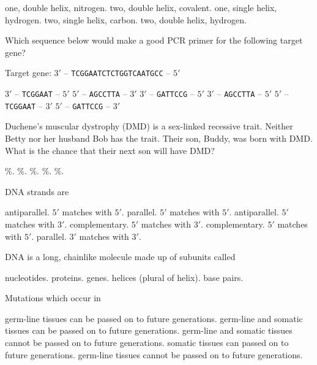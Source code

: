 \begin{choices}
\choice one, double helix, nitrogen.
\choice two, double helix, covalent.
\choice one, single helix, hydrogen.
\choice two, single helix, carbon.
\correctchoice two, double helix, hydrogen.
\end{choices}

\question
Which sequence below would make a good PCR primer for the following target gene?

\vspace{0.4\baselineskip}
Target gene: $3'$ -- \texttt{TCGGAATCTCTGGTCAATGCC} -- $5'$

\begin{choices}
\choice $3'$ -- \texttt{TCGGAAT} -- $5'$
\correctchoice $5'$ -- \texttt{AGCCTTA} -- $3'$
\choice $3'$ -- \texttt{GATTCCG} -- $5'$
\choice $3'$ -- \texttt{AGCCTTA} -- $5'$
\choice $5'$ -- \texttt{TCGGAAT} -- $3'$
\choice $5'$ -- \texttt{GATTCCG} -- $3'$
\end{choices}

\question
Duchene's muscular dystrophy (DMD) is a sex-linked recessive trait. Neither Betty nor her husband Bob has the trait. Their son, Buddy, was born with DMD. What is the chance that their next son will have DMD?

\begin{choices}
\%.
\%.
\%.
\%.
\%.
\end{choices}

\question
DNA strands are

\begin{choices}
\choice antiparallel. $5'$ matches with $5'$.
\choice parallel. $5'$ matches with $5'$.
\correctchoice antiparallel. $5'$ matches with $3'$.
\choice complementary. $5'$ matches with $3'$.
\choice complementary. $5'$ matches with $5'$.
\choice parallel. $3'$ matches with $3'$.
\end{choices}

\question
DNA is a long, chainlike molecule made up of subunits called

\begin{choices}
\correctchoice nucleotides.
\choice proteins.
\choice genes.
\choice helices (plural of helix).
\choice base pairs.
\end{choices}

\question
Mutations which occur in 

\begin{choices}
\correctchoice germ-line tissues can be passed on to future generations.
\choice germ-line  and somatic tissues can be passed on to future generations.
\choice germ-line and somatic tissues cannot be passed on to future generations.
\choice somatic tissues can passed on to future generations.
\choice germ-line tissues cannot be passed on to future generations.
\end{choices}
